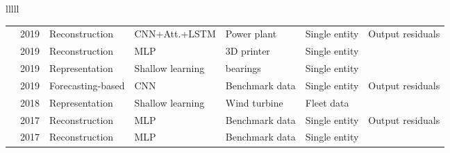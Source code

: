 \begin{landscape}
\begin{longtable}{lllll}
\begin{tabular}{lllllll}
\cite{zhangDeepNeuralNetwork2019} & 2019 & Reconstruction & CNN+Att.+LSTM & Power plant & Single entity & Output residuals \\
\cite{zhangDynamicConditionMonitoring2019} & 2019 & Reconstruction & MLP & 3D printer & Single entity & \texttimes \\
\cite{songUnsupervisedFaultDiagnosis2019} & 2019 & Representation & Shallow learning & bearings & Single entity & \texttimes \\
\cite{munirFuseADUnsupervisedAnomaly2019} & 2019 & Forecasting-based & CNN & Benchmark data & Single entity & Output residuals \\
\cite{helsenFleetwideConditionMonitoring2018} & 2018 & Representation & Shallow learning & Wind turbine & Fleet data & \texttimes \\
\cite{shipmonTimeSeriesAnomaly2017} & 2017 & Reconstruction & MLP & Benchmark data & Single entity & Output residuals \\
\cite{zhouAnomalyDetectionRobust2017} & 2017 & Reconstruction & MLP & Benchmark data & Single entity & \texttimes \\
\bottomrule
\end{tabular}

\end{longtable}
\end{landscape}
